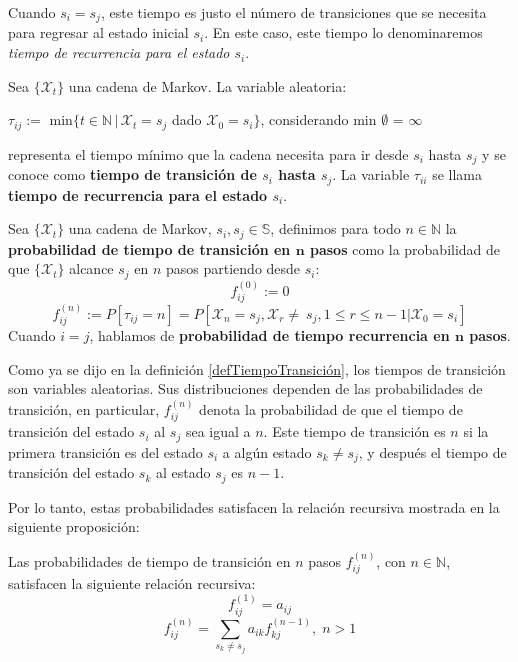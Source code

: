 Cuando $s_i=s_j$, este tiempo es justo el número de transiciones que se necesita para regresar al estado inicial $s_i$. En este caso, este tiempo lo denominaremos \textit{tiempo de recurrencia para el estado $s_i$}.

\begin{definition}\label{defTiempoTransición}
Sea $\{\mathcal{X}_t\}$ una cadena de Markov. La variable aleatoria:
\begin{center}
    $\tau_{ij} := $ min$\{t\in\mathbb{N}\,|\, \mathcal{X}_t=s_j$ dado $\mathcal{X}_0=s_i\}$, considerando min $\emptyset$ = $\infty$
\end{center}
representa el tiempo mínimo que la cadena necesita para ir desde $s_i$ hasta $s_j$ y se conoce como \textbf{tiempo de transición de $s_i$ hasta $s_j$}. La variable $\tau_{ii}$ se llama \textbf{tiempo de recurrencia para el estado $s_i$}.
\end{definition}

\begin{definition}
Sea $\{\mathcal{X}_t\}$ una cadena de Markov, $s_i,s_j\in\mathbb{S}$, definimos para todo $n\in\mathbb{N}$ la \textbf{probabilidad de tiempo de transición en $\boldsymbol{n}$ pasos} como la probabilidad de que $\{\mathcal{X}_t\}$ alcance $s_j$ en $n$ pasos partiendo desde $s_i$:
\[f_{ij}^{(0)}:=0\]
\[f_{ij}^{(n)}:=P[\tau_{ij}=n]=P[\mathcal{X}_n=s_j, \mathcal{X}_r\neq\ s_j, 1\leq r\leq n-1|\mathcal{X}_0=s_i]\]
Cuando $i=j$, hablamos de \textbf{probabilidad de tiempo recurrencia en $\boldsymbol{n}$ pasos}.
\end{definition}

Como ya se dijo en la definición \ref{defTiempoTransición}, los tiempos de transición son variables aleatorias. Sus distribuciones dependen de las probabilidades de transición, en particular, $f_{ij}^{(n)}$ denota la probabilidad de que el tiempo de transición del estado $s_i$ al $s_j$ sea igual a $n$. Este tiempo de transición es $n$ si la primera transición es del estado $s_i$ a algún estado $s_k\neq s_j$, y después el tiempo de transición del estado $s_k$ al estado $s_j$ es $n-1$.

Por lo tanto, estas probabilidades satisfacen la relación recursiva mostrada en la siguiente proposición:
\begin{proposition}\label{ecTiempoTransiciónNPasos}
    Las probabilidades de tiempo de transición en $n$ pasos $f_{ij}^{(n)}$, con $n\in\mathbb{N}$, satisfacen la siguiente relación recursiva:
    \[f_{ij}^{(1)}=a_{ij}\]
    \[f_{ij}^{(n)}=\sum_{s_k\neq s_j} a_{ik} f_{kj}^{(n-1)},\;n>1\]
\end{proposition}

